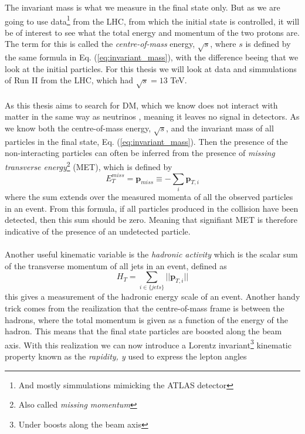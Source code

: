 \documentclass[14pt, a4paper]{book}
\begin{document}
The invariant mass is what we measure in the final state only. But as we are going to use data\footnote{And mostly simmulations mimicking the ATLAS detector} from the LHC, from which the initial state is controlled, 
it will be of interest to see what the total energy and momentum of the two protons are. The term for this is called the \textit{centre-of-mass} energy, $\sqrt s$, where $s$ is defined by the same formula in Eq. (\ref{eq:invariant_mass}), 
with the difference beeing that we look at the initial particles. For this thesis we will look at data and simmulations of Run II from the LHC, which had $\sqrt s = 13$ TeV. \\
\\As this thesis aims to search for DM, which we know does not interact with matter in the same way as neutrinos , meaning it leaves no signal in detectors. 
As we know both the centre-of-mass energy, $\sqrt s$, and the invariant mass of all particles in the final state, Eq. (\ref{eq:invariant_mass}). Then the presence of the non-interacting particles can often be 
inferred from the presence of \textit{missing transverse energy}\footnote{Also called \textit{missing momentum}} (MET), which is defined by
\begin{equation}\label{eq:MET}
    E_T^{miss} = \mathbf{p}_{miss} \equiv -\sum_i \mathbf{p}_{T,i}
\end{equation}
where the sum extends over the measured momenta of all the observed particles in an event. From this formula, if all particles produced in the collision have been detected, then this sum should be zero. Meaning that 
signifiant MET is therefore indicative of the presence of an undetected particle. \\
\\Another useful kinematic variable is the \textit{hadronic activity} which is the scalar sum of the transverse momentum of all jets in an event, defined as
\begin{equation}\label{eq:HT}
    H_T = \sum_{i\in\{jets\}} \vert\vert \mathbf{p}_{T,i}\vert\vert
\end{equation}
this gives a measurement of the hadronic energy scale of an event. Another handy trick comes from the reailization that the centre-of-mass frame is between the hadrons, where the total momentum is given as a function of the energy of the hadron. 
This means that the final state particles are boosted along the beam axis. With this realization we can now introduce a Lorentz invariant\footnote{Under boosts along the beam axis} kinematic property known as the \textit{rapidity, y} used to express the lepton angles
\end{document}
